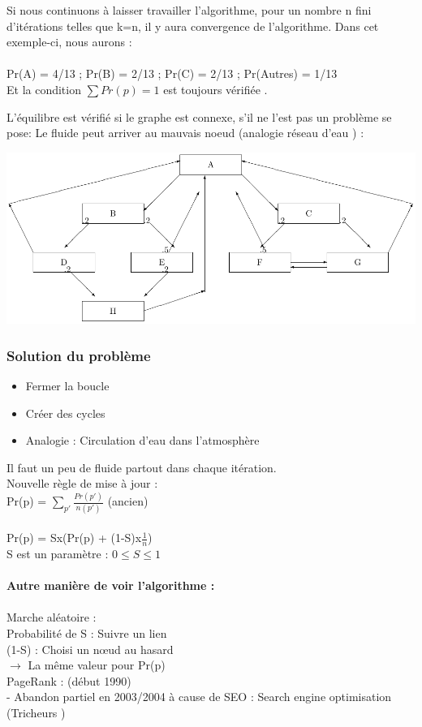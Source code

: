  Si nous continuons à laisser travailler l'algorithme, pour un nombre n fini d'itérations telles que k=n, il y aura convergence de l'algorithme. Dans cet exemple-ci,  nous aurons :\\
 \\
 Pr(A) = 4/13 ; Pr(B) = 2/13 ; Pr(C) = 2/13 ; Pr(Autres) = 1/13 \\
 Et la condition $ \sum Pr(p) = 1 $ est toujours vérifiée .
 
 L'équilibre est vérifié si le graphe est connexe, s’il ne l'est pas un problème se pose: Le fluide peut arriver au mauvais noeud (analogie réseau d'eau )  :

\includegraphics[scale=0.8]{images/24_Nconnexe.pdf}

\subsubsection*{Solution du problème}
\begin{itemize}
\item Fermer la boucle
\item Créer des cycles
\item Analogie : Circulation d'eau dans l'atmosphère
\end{itemize}
 	Il faut un peu de fluide partout dans chaque itération.\\
 	Nouvelle règle de mise à jour : \\
 	
      Pr(p) = $ \sum_ {p'}\frac{Pr(p')}{n(p')} $ (ancien) \\
     \\
         Pr(p) = Sx(Pr(p) + (1-S)x$\frac{1}{n}$) \\
         S est un paramètre : $ 0 \le S \le 1 $ \\
         \\
        \textbf{ Autre manière de voir l'algorithme :} \\
        \\
        Marche aléatoire : 
        \\
        Probabilité de S : Suivre un lien \\
        (1-S) : Choisi un nœud au hasard \\
        $\rightarrow $ La même valeur pour Pr(p) \\
        PageRank : (début 1990) \\
        - Abandon partiel en 2003/2004 à cause de SEO : Search engine optimisation (Tricheurs )
